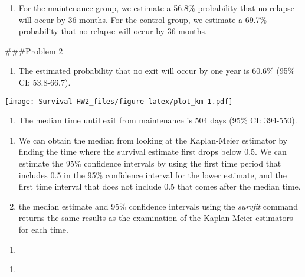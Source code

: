 \documentclass[
]{article}
\providecommand{\tightlist}{%
  \setlength{\itemsep}{0pt}\setlength{\parskip}{0pt}}
\begin{document}
\begin{enumerate}
\def\labelenumi{(\alph{enumi})}
\setcounter{enumi}{1}
\tightlist
\item
  For the maintenance group, we estimate a 56.8\% probability that no
  relapse will occur by 36 months. For the control group, we estimate a
  69.7\% probability that no relapse will occur by 36 months.
\end{enumerate}

\#\#\#Problem 2

\begin{enumerate}
\def\labelenumi{(\alph{enumi})}
\tightlist
\item
  The estimated probability that no exit will occur by one year is
  60.6\% (95\% CI: 53.8-66.7).
\end{enumerate}

\texttt{[image: Survival-HW2\_files/figure-latex/plot\_km-1.pdf]}

\begin{enumerate}
\def\labelenumi{(\alph{enumi})}
\setcounter{enumi}{1}
\tightlist
\item
  The median time until exit from maintenance is 504 days (95\% CI:
  394-550).
\end{enumerate}

\begin{enumerate}
\def\labelenumi{\roman{enumi}.}
\tightlist
\item
  We can obtain the median from looking at the Kaplan-Meier estimator by
  finding the time where the survival estimate first drops below 0.5. We
  can estimate the 95\% confidence intervals by using the first time
  period that includes 0.5 in the 95\% confidence interval for the lower
  estimate, and the first time interval that does not include 0.5 that
  comes after the median time.
\item
  the median estimate and 95\% confidence intervals using the
  \emph{survfit} command returns the same results as the examination of
  the Kaplan-Meier estimators for each time.
\end{enumerate}

\begin{enumerate}
\def\labelenumi{(\alph{enumi})}
\setcounter{enumi}{2}
\item
\end{enumerate}

\begin{enumerate}
\def\labelenumi{\roman{enumi}.}
\item
\end{enumerate}
\end{document}
